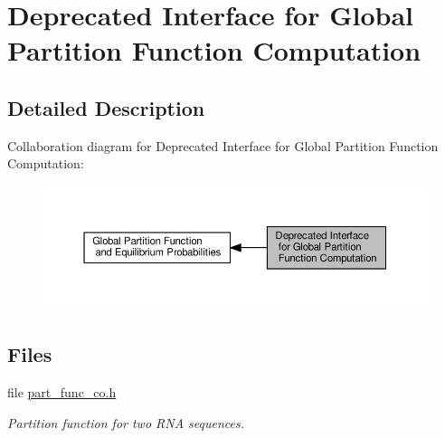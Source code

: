 \hypertarget{group__part__func__global__deprecated}{}\section{Deprecated Interface for Global Partition Function Computation}
\label{group__part__func__global__deprecated}


\subsection{Detailed Description}
Collaboration diagram for Deprecated Interface for Global Partition Function Computation\+:
\nopagebreak
\begin{figure}[H]
\begin{center}
\leavevmode
\includegraphics[width=350pt]{group__part__func__global__deprecated}
\end{center}
\end{figure}
\subsection*{Files}
\begin{DoxyCompactItemize}
\item 
file \hyperlink{part__func__co_8h}{part\+\_\+func\+\_\+co.\+h}
\begin{DoxyCompactList}\small\item\em Partition function for two R\+NA sequences. \end{DoxyCompactList}\end{DoxyCompactItemize}
